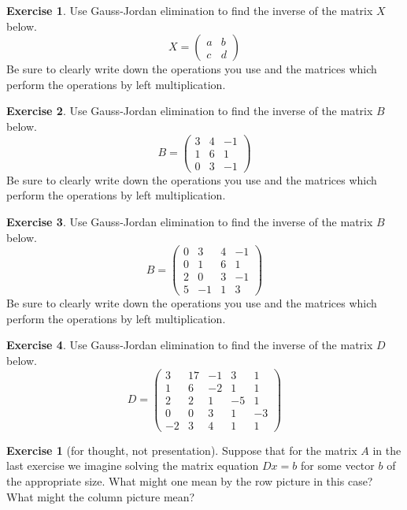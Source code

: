\documentclass[11pt]{amsart}
\theoremstyle{definition}
\newtheorem{exercise}{Exercise}
\newtheorem*{noexercise}{Exercise}
\begin{document}
\begin{exercise}
Use Gauss-Jordan elimination to find the inverse of the matrix $X$ below.
\[
X = \begin{pmatrix} a & b \\ c & d \end{pmatrix}
\]
Be sure to clearly write down the operations you use and the matrices which perform the operations by left multiplication.
\end{exercise}

\begin{exercise}
Use Gauss-Jordan elimination to find the inverse of the matrix $B$ below.
\[
B = \begin{pmatrix} 3 & 4 & -1\\ 1 & 6 & 1 \\ 0 & 3 & -1 \end{pmatrix}
\]
Be sure to clearly write down the operations you use and the matrices which perform the operations by left multiplication.
\end{exercise}

\begin{exercise}
Use Gauss-Jordan elimination to find the inverse of the matrix $B$ below.
\[
B = \begin{pmatrix}
0 & 3 & 4 & -1\\
0 & 1 & 6 & 1 \\
2 & 0 & 3 & -1 \\
5 & -1 & 1 & 3
\end{pmatrix}
\]
Be sure to clearly write down the operations you use and the matrices which perform the operations by left multiplication.
\end{exercise}



\begin{exercise}
Use Gauss-Jordan elimination to find the inverse of the matrix $D$ below.
\[
D = \begin{pmatrix}
3 & 17 & -1 & 3 & 1 \\ 1 & 6 & -2 & 1 & 1 \\
2 & 2 & 1 & -5 & 1 \\ 0 & 0 & 3 & 1 & -3 \\
-2 & 3 & 4 & 1 & 1
\end{pmatrix}
\]
\end{exercise}

\begin{noexercise}[for thought, not presentation]
Suppose that for the matrix $A$ in the last exercise we imagine solving the matrix equation $Dx = b$ for some vector $b$ of the appropriate size. What might one mean by the row picture in this case? What might the column picture mean?
\end{noexercise}
\end{document}
